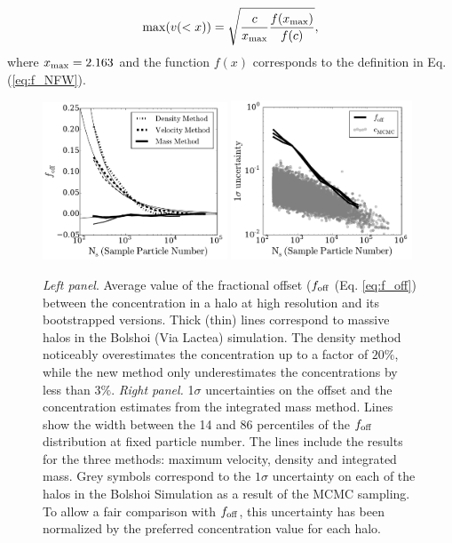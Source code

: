 \documentclass{emulateapj}
\begin{document}
\begin{equation}
\mathrm{max}(v(<x)) = \sqrt{\frac{c}{x_{\rm max}}\frac{f(x_{\rm
      max})}{f(c)}},
\label{eq:max_v}
\end{equation}
where $x_{\rm max}=2.163$ \citep{Klypin2016} and the function $f(x)$
corresponds to the definition in Eq. (\ref{eq:f_NFW}).


\begin{figure}
\begin{center}
  \includegraphics[width=0.49\textwidth]{avg_foff_bolshoi.pdf}
  \includegraphics[width=0.48\textwidth]{sigma_foff_bolshoi.pdf}
\end{center}
\vspace{-0.5cm}
\caption{\emph{Left panel}. Average value of the fractional offset ($f_{\rm
    off}$ (Eq. \ref{eq:f_off}) between the concentration in a halo at 
  high resolution and its bootstrapped versions. 
  Thick (thin) lines correspond to massive halos in the Bolshoi (Via
  Lactea) simulation.
  The density method noticeably overestimates the concentration up to
  a factor of $20\%$, 
  while the new method only underestimates the concentrations by less
  than $3\%$.
  \emph{Right panel.}
  1$\sigma$ uncertainties on the offset and the concentration
  estimates from the integrated mass method.  
  Lines show the width between the 14 and 86 percentiles
  of the $f_{\rm off}$ distribution at fixed particle number. 
  The lines include the results for the three methods: maximum
  velocity, density and integrated mass.
  Grey symbols correspond to the $1\sigma$ uncertainty on each of
  the halos in the Bolshoi Simulation as a result of the MCMC
  sampling. 
  To allow a fair comparison with $f_{\rm off}$, this uncertainty has
  been normalized by the preferred concentration value for each halo. 
  \label{fig:downsampling}}
\end{figure}
\end{document}
